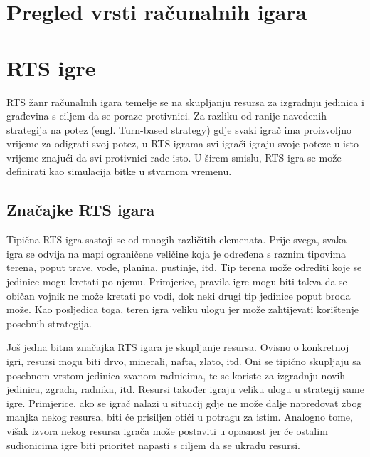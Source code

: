 \documentclass[times, utf8, zavrsni, numeric]{fer}
\begin{document}

\chapter{Pregled vrsti računalnih igara}\label{games}

\chapter{RTS igre}\label{rtsGames}
RTS žanr računalnih igara temelje se na skupljanju resursa za izgradnju jedinica i građevina s ciljem da se poraze protivnici. Za razliku od ranije navedenih strategija na potez (engl. Turn-based strategy) gdje svaki igrač ima proizvoljno vrijeme za odigrati svoj potez, u RTS igrama svi igrači igraju svoje poteze u isto vrijeme znajući da svi protivnici rade isto. U širem smislu, RTS igra se može definirati kao simulacija bitke u stvarnom vremenu\cite{url:WhatDoesRTSMean}.


\section{Značajke RTS igara}
\par Tipična RTS igra sastoji se od mnogih različitih elemenata. Prije svega, svaka igra se odvija na mapi ograničene veličine koja je određena s raznim tipovima terena, poput trave, vode, planina, pustinje, itd. Tip terena može odrediti koje se jedinice mogu kretati po njemu. Primjerice, pravila igre mogu biti takva da se običan vojnik ne može kretati po vodi, dok neki drugi tip jedinice poput broda može. Kao posljedica toga, teren igra veliku ulogu jer može zahtijevati korištenje posebnih strategija.

\par Još jedna bitna značajka RTS igara je skupljanje resursa. Ovisno o konkretnoj igri, resursi mogu biti drvo, minerali, nafta, zlato, itd. Oni se tipično skupljaju sa posebnom vrstom jedinica zvanom radnicima, te se koriste za izgradnju novih jedinica, zgrada, radnika, itd. Resursi također igraju veliku ulogu u strategij same igre. Primjerice, ako se igrač nalazi u situacij gdje ne može dalje napredovat zbog manjka nekog resursa, biti će prisiljen otići u potragu za istim. Analogno tome, višak izvora nekog resursa igrača može postaviti u opasnost jer će ostalim sudionicima igre biti prioritet napasti s ciljem da se ukradu resursi.
\end{document}
